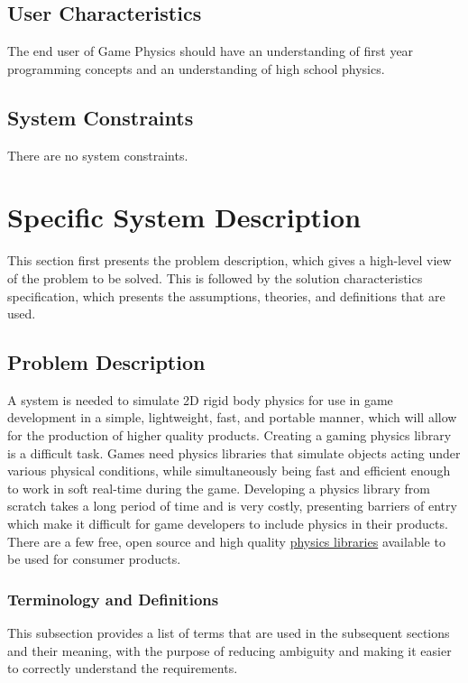 \documentclass[12pt]{article}
\begin{document}
\subsection{User Characteristics}
\label{Sec:UserChars}
The end user of Game Physics should have an understanding of first year programming concepts and an understanding of high school physics.

\subsection{System Constraints}
\label{Sec:SysConstraints}
There are no system constraints.

\section{Specific System Description}
\label{Sec:SpecSystDesc}
This section first presents the problem description, which gives a high-level view of the problem to be solved. This is followed by the solution characteristics specification, which presents the assumptions, theories, and definitions that are used.

\subsection{Problem Description}
\label{Sec:ProbDesc}
A system is needed to simulate 2D rigid body physics for use in game development in a simple, lightweight, fast, and portable manner, which will allow for the production of higher quality products. Creating a gaming physics library is a difficult task. Games need physics libraries that simulate objects acting under various physical conditions, while simultaneously being fast and efficient enough to work in soft real-time during the game. Developing a physics library from scratch takes a long period of time and is very costly, presenting barriers of entry which make it difficult for game developers to include physics in their products. There are a few free, open source and high quality \hyperref[Sec:offShelfSolns]{physics libraries} available to be used for consumer products.

\subsubsection{Terminology and Definitions}
\label{Sec:TermDefs}
This subsection provides a list of terms that are used in the subsequent sections and their meaning, with the purpose of reducing ambiguity and making it easier to correctly understand the requirements.
\end{document}
